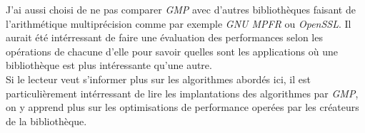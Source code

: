 \documentclass[letterpaper]{article}
\begin{document}
J'ai aussi choisi de ne pas comparer \emph{GMP} avec d'autres bibliothèques
faisant de l'arithmétique multiprécision comme par exemple \emph{GNU MPFR} ou
\emph{OpenSSL}. Il aurait été intérressant de faire une évaluation des
performances selon les opérations de chacune d'elle pour savoir quelles sont les
applications où une bibliothèque est plus intéressante qu'une autre.\\

Si le lecteur veut s'informer plus sur les algorithmes abordés ici, il est
particulièrement intérressant de lire les implantations des algorithmes par
\emph{GMP}, on y apprend plus sur les optimisations de performance
operées par les créateurs de la bibliothèque.

\footnotesize



\end{document}
